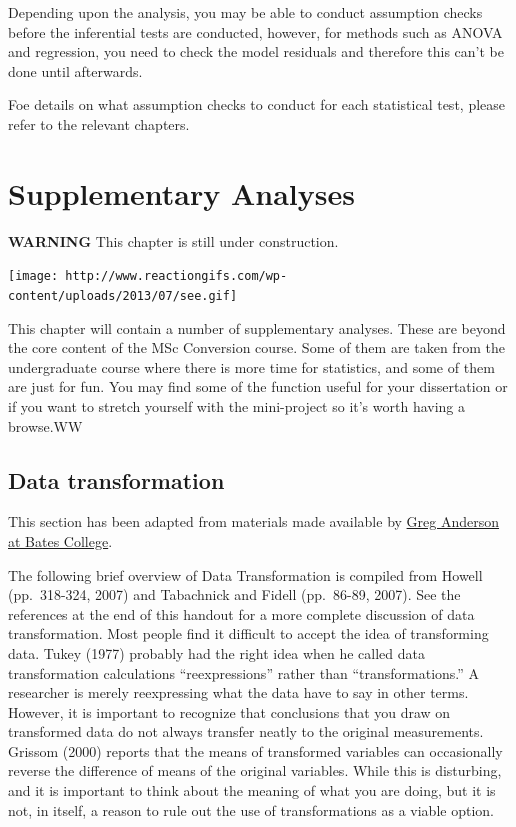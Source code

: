\documentclass[]{book}
\begin{document}
Depending upon the analysis, you may be able to conduct assumption checks before the inferential tests are conducted, however, for methods such as ANOVA and regression, you need to check the model residuals and therefore this can't be done until afterwards.

Foe details on what assumption checks to conduct for each statistical test, please refer to the relevant chapters.

\hypertarget{refsup}{%
\chapter{Supplementary Analyses}\label{refsup}}

\textbf{WARNING} This chapter is still under construction.

\texttt{[image: http://www.reactiongifs.com/wp-content/uploads/2013/07/see.gif]}

This chapter will contain a number of supplementary analyses. These are beyond the core content of the MSc Conversion course. Some of them are taken from the undergraduate course where there is more time for statistics, and some of them are just for fun. You may find some of the function useful for your dissertation or if you want to stretch yourself with the mini-project so it's worth having a browse.WW

\hypertarget{data-transformation}{%
\section{Data transformation}\label{data-transformation}}

This section has been adapted from materials made available by \href{http://abacus.bates.edu/~ganderso/biology/bio270/homework_files/Data_Transformation.pdf}{Greg Anderson at Bates College}.

The following brief overview of Data Transformation is compiled from Howell (pp.~318-324,
2007) and Tabachnick and Fidell (pp.~86-89, 2007). See the references at the end of this handout for a more complete discussion of data transformation. Most people find it difficult to accept the idea of transforming data. Tukey (1977) probably had the right idea when he called data transformation calculations ``reexpressions'' rather than ``transformations.'' A researcher is merely reexpressing what the data have to say in other terms. However, it is important to recognize that conclusions that you draw on transformed data do not always transfer neatly to the original measurements. Grissom (2000) reports that the means of transformed variables can occasionally reverse the difference of means of the original variables. While this is disturbing, and it is important to think about the meaning of what you are doing, but it is not, in itself, a reason to rule out the use of transformations as a viable option.
\end{document}

